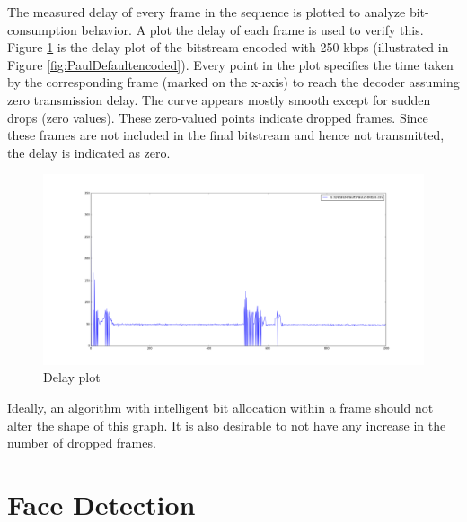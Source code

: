 \documentclass[11pt]{article} %
\begin{document}
The measured delay of every frame in the sequence is plotted to analyze bit-consumption behavior. A plot the delay of each frame is used to verify this. Figure \ref{fig:PaulDefault250kbpsDelay} is the delay plot of the bitstream encoded with 250 kbps (illustrated in Figure \ref{fig:PaulDefaultencoded}). Every point in the plot specifies the time taken by the corresponding frame (marked on the x-axis) to reach the decoder assuming zero transmission delay. The curve appears mostly smooth except for sudden drops (zero values). These zero-valued points indicate dropped frames. Since these frames are not included in the final bitstream and hence not transmitted, the delay is indicated as zero. 
\begin{figure}[!h]
    \includegraphics[scale=0.25]{PaulDefault250kbpsDelay}
    \caption{Delay plot}
    \label{fig:PaulDefault250kbpsDelay}
\end{figure} 
Ideally, an algorithm with intelligent bit allocation within a frame should not alter the shape of this graph. It is also desirable to not have any increase in the number of dropped frames. %
%
%
\section{Face Detection}
\end{document}
